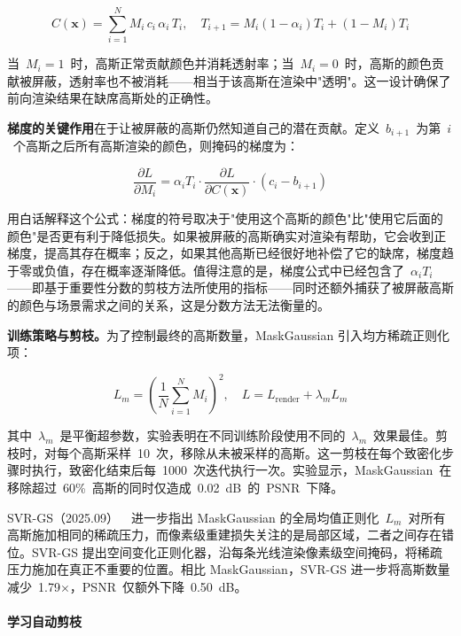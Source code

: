 \begin{equation}
C(\mathbf{x}) = \sum_{i=1}^{N} M_i \, c_i \, \alpha_i \, T_i, \quad T_{i+1} = M_i (1-\alpha_i) T_i + (1-M_i) T_i
\end{equation}

当~$M_i = 1$~时，高斯正常贡献颜色并消耗透射率；当~$M_i = 0$~时，高斯的颜色贡献被屏蔽，透射率也不被消耗——相当于该高斯在渲染中"透明"。这一设计确保了前向渲染结果在缺席高斯处的正确性。

\textbf{梯度的关键作用}在于让被屏蔽的高斯仍然知道自己的潜在贡献。定义~$b_{i+1}$~为第~$i$~个高斯之后所有高斯渲染的颜色，则掩码的梯度为：

\begin{equation}
\frac{\partial L}{\partial M_i} = \alpha_i T_i \cdot \frac{\partial L}{\partial C(\mathbf{x})} \cdot (c_i - b_{i+1})
\end{equation}

用白话解释这个公式：梯度的符号取决于"使用这个高斯的颜色"比"使用它后面的颜色"是否更有利于降低损失。如果被屏蔽的高斯确实对渲染有帮助，它会收到正梯度，提高其存在概率；反之，如果其他高斯已经很好地补偿了它的缺席，梯度趋于零或负值，存在概率逐渐降低。值得注意的是，梯度公式中已经包含了~$\alpha_i T_i$——即基于重要性分数的剪枝方法所使用的指标——同时还额外捕获了被屏蔽高斯的颜色与场景需求之间的关系，这是分数方法无法衡量的。

\textbf{训练策略与剪枝。}为了控制最终的高斯数量，MaskGaussian 引入均方稀疏正则化项：

\begin{equation}
L_m = \left(\frac{1}{N} \sum_{i=1}^{N} M_i\right)^2, \quad L = L_{\text{render}} + \lambda_m L_m
\end{equation}

其中~$\lambda_m$~是平衡超参数，实验表明在不同训练阶段使用不同的~$\lambda_m$~效果最佳。剪枝时，对每个高斯采样~10~次，移除从未被采样的高斯。这一剪枝在每个致密化步骤时执行，致密化结束后每~1000~次迭代执行一次。实验显示，MaskGaussian~在移除超过~60\%~高斯的同时仅造成~0.02~dB~的~PSNR~下降。

SVR-GS（2025.09）~\cite{2509_11116}~进一步指出 MaskGaussian 的全局均值正则化~$L_m$~对所有高斯施加相同的稀疏压力，而像素级重建损失关注的是局部区域，二者之间存在错位。SVR-GS 提出空间变化正则化器，沿每条光线渲染像素级空间掩码，将稀疏压力施加在真正不重要的位置。相比 MaskGaussian，SVR-GS 进一步将高斯数量减少~1.79$\times$，PSNR~仅额外下降~0.50~dB。

\paragraph{学习自动剪枝}

